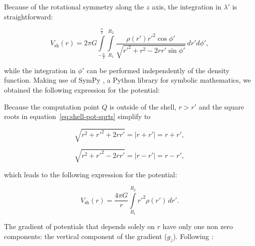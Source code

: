 \documentclass[extra, referee]{gji}
\begin{document}
\noindent
Because of the rotational symmetry along the $z$ axis, the integration in $\lambda'$ is
straightforward:

\begin{equation}
    V_\text{sh}(r) = 2\pi G
    \int\limits_{-\frac{\pi}{2}}^\frac{\pi}{2}
    \int\limits_{R_1}^{R_2}
    \frac{\rho(r') {r'}^2 \cos\phi'}{\sqrt{r'^2 + r^2 - 2 r r' \sin\phi'}}
    \, dr' d\phi',
\end{equation}

\noindent
while the integration in $\phi'$ can be performed independently of the density function.
Making use of SymPy \citep{sympy2017}, a Python library for symbolic mathematics, we
obtained the following expression for the potential:


Because the computation point $Q$ is outside of the shell, $r > r'$ and the square roots
in equation~\ref{eq:shell-pot-sqrts} simplify to

\begin{equation}
    \sqrt{r^2 + r'^2 + 2rr'} = |r + r'| = r + r',
\end{equation}

\begin{equation}
    \sqrt{r^2 + r'^2 - 2rr'} = |r - r'| = r - r',
\end{equation}

\noindent which leads to the following expression for the potential:

\begin{equation}
    V_\text{sh}(r) = \frac{4\pi G}{r}
    \int\limits_{R_1}^{R_2} {r'}^2 \rho(r') \, dr'.
\label{eq:shell-pot}
\end{equation}

The gradient of potentials that
depends solely on $r$ have only one non zero components: the vertical
component of the gradient ($g_z$).
Following \citet{Grombein2013}:
\end{document}
